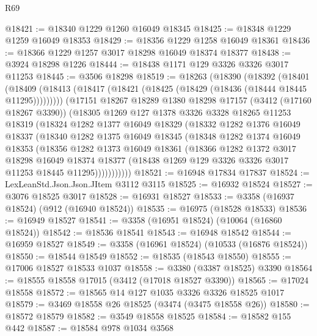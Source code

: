 \begin{lexlean}{R69}
\begin{coremodule}
@18421 := @18340 @1229 @1260 @16049 @18345
@18425 := @18348 @1229 @1259 @16049 @18353
@18429 := @18356 @1229 @1258 @16049 @18361
@18436 := @18366 @1229 @1257 @3017 @18298 @16049 @18374 @18377
@18438 := @3924 @18298 @1226
@18444 := @18438 @1171 @129 @3326 @3326 @3017 @11253
@18445 := @3506 @18298
@18519 := @18263
    (@18390
      (@18392
        (@18401
          (@18409 (@18413 (@18417 (@18421 (@18425 (@18429 (@18436 (@18444 @18445 @11295)))))))))
        (@17151
          @18267
          @18289
          @1380
          @18298
          @17157
          (@3412 (@17160 @18267 @3390))
          (@18305
            @1269
            @127
            @1378
            @3326
            @3328
            @18265
            @11253
            @18319
            (@18324
              @1282
              @1377
              @16049
              @18329
              (@18332
                @1282
                @1376
                @16049
                @18337
                (@18340
                  @1282
                  @1375
                  @16049
                  @18345
                  (@18348
                    @1282
                    @1374
                    @16049
                    @18353
                    (@18356
                      @1282
                      @1373
                      @16049
                      @18361
                      (@18366
                        @1282
                        @1372
                        @3017
                        @18298
                        @16049
                        @18374
                        @18377
                        (@18438 @1269 @129 @3326 @3326 @3017 @11253 @18445 @11295)))))))))))
@18521 := @16948 @17834 @17837
@18524 := LexLeanStd.Json.Json.JItem @3112 @3115
@18525 := @16932 @18524
@18527 := @3076 @18525 @3017
@18528 := @16931 @18527
@18533 := @3358 (@16937 @18524) (@912 (@16940 @18524))
@18535 := @16975 (@18528 @18533)
@18536 := @16949 @18527
@18541 := @3358 (@16951 @18524) (@10064 (@16860 @18524))
@18542 := @18536 @18541
@18543 := @16948 @18542
@18544 := @16959 @18527
@18549 := @3358 (@16961 @18524) (@10533 (@16876 @18524))
@18550 := @18544 @18549
@18552 := @18535 (@18543 @18550)
@18555 := @17006 @18527 @18533 @1037
@18558 := @3380 (@3387 @18525) @3390
@18564 := @18555 @18558 @17015 (@3412 (@17018 @18527 @3390))
@18565 := @17024 @18558
@18572 := @18565 @14 @127 @1035 @3326 @3326 @18525 @1017
@18579 := @3469 @18558 @26 @18525 (@3474 (@3475 @18558 @26))
@18580 := @18572 @18579
@18582 := @3549 @18558 @18525
@18584 := @18582 @155 @442
@18587 := @18584 @978 @1034 @3568

\end{coremodule}
\end{lexlean}
